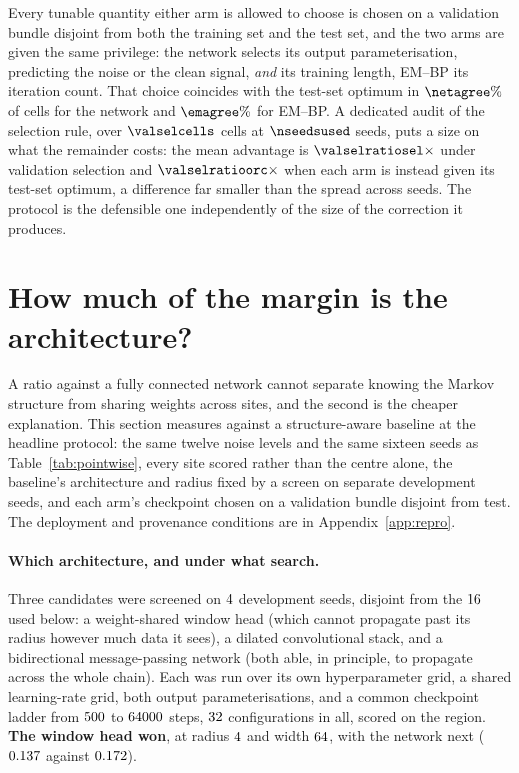 Every tunable quantity either arm is allowed to choose is chosen on a
validation bundle disjoint from both the training set and the test set, and the
two arms are given the same privilege: the network selects its output
parameterisation, predicting the noise or the clean signal, \emph{and} its
training length, EM--BP its iteration count. That choice coincides with the
test-set optimum in $\netagree\%$ of cells for the network and $\emagree\%$ for
EM--BP. A dedicated audit of the selection rule, over $\valselcells$ cells at
$\nseedsused$ seeds, puts a size on what the remainder costs: the mean advantage
is $\valselratiosel\times$ under validation selection and
$\valselratioorc\times$ when each arm is instead given its test-set optimum, a
difference far smaller than the spread across seeds. The protocol is the
defensible one independently of the size of the correction it produces.

\section{How much of the margin is the architecture?}\label{sec:em-architecture}

A ratio against a fully connected network cannot separate knowing the Markov
structure from sharing weights across sites, and the second is the cheaper
explanation. This section measures against a structure-aware baseline at the
headline protocol: the same twelve noise levels and the same sixteen seeds as
Table~\ref{tab:pointwise}, every site scored rather than the centre alone, the
baseline's architecture and radius fixed by a screen on separate development
seeds, and each arm's checkpoint chosen on a validation bundle disjoint from
test. The deployment and provenance conditions are in
Appendix~\ref{app:repro}.

\paragraph{Which architecture, and under what search.} Three candidates were
screened on $4$ development seeds, disjoint from the
$16$ used below: a weight-shared window head (which cannot propagate
past its radius however much data it sees), a dilated convolutional stack, and a
bidirectional message-passing network (both able, in principle, to propagate
across the whole chain). Each was run over its own hyperparameter grid, a
shared learning-rate grid, both output parameterisations, and a common
checkpoint ladder from $500$ to $64000$ steps, $32$ configurations in all, scored on the \screenregion{} region.
\textbf{The window head won}, at radius $4$ and width
$64$, with the \screenrunnerup{} network next
($0.137$ against $0.172$).

